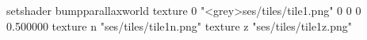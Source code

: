 setshader bumpparallaxworld
texture 0 "<grey>ses/tiles/tile1.png" 0 0 0 0.500000
texture n "ses/tiles/tile1n.png"
texture z "ses/tiles/tile1z.png"

